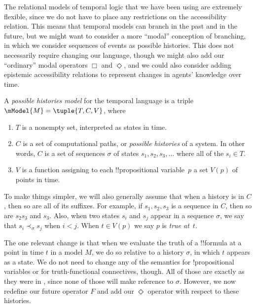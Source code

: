 \documentclass[../../../include/open-logic-section]{subfiles}
\begin{document}


The relational models of temporal logic that we have been using are extremely flexible, since we do not have to place
any restrictions on the accessibility relation. This means that temporal models can branch in the past and in the future,
but we might want to consider a more ``modal'' conception of branching, in which we consider sequences of events
as possible histories. This does not necessarily require changing our language, though we might also add our ``ordinary''
modal operators $\Box$ and $\Diamond$, and we could also consider adding epistemic accessibility relations to 
represent changes in agents' knowledge over time.

\begin{defn}
  A \emph{possible histories model} for the temporal language is a triple
  $\mModel{M} = \tuple{T, C, V}$, where
  \begin{enumerate}
  \item $T$ is a nonempty set, interpreted as states in time.
  \item $C$ is a set of computational paths, or \emph{possible histories} of a system. In other
  words, $C$ is a set of sequences $\sigma$ of states $s_1, s_2, s_3, ...$ where all of the $s_i \in T$.
    \item $V$ is a function assigning to each !!{propositional variable}~$p$ a set $V(p)$ of points in time.
  \end{enumerate}
  To make things simpler, we will also generally assume that when a history is in $C$, then so are all of its suffixes. For example, if $s_1, s_2, s_3$ is a sequence in $C$, then so are $s_2 s_3$ and $s_3$. 
 Also, when two states $s_i$ and $s_j$ appear in a sequence $\sigma$, we say that $s_i \prec_\sigma s_j$ when $i < j$. 
  When $t \in V(p)$ we say $p$ is \emph{true at}~$t$.
\end{defn}

The one relevant change is that when we evaluate the truth of a !!{formula} at a point in time $t$ in a model $M$, 
we do so relative to a history $\sigma$, in which $t$ appears as a state. We do not need to change any of the semantics for !{propositional variables} or for truth-functional connectives, though. All of those are exactly as they were in , since none of those will make reference to $\sigma$. However, we now redefine our future operator $F$ and add our $\Diamond$ operator with respect to these histories. 
\end{document}
